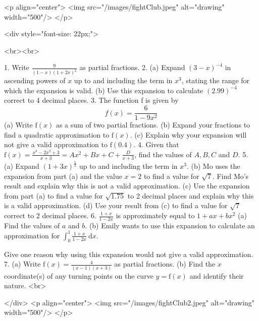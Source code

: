 <p align="center">
<img src="/images/fightClub.jpeg" alt="drawing" width="500"/>
</p>

<div style="font-size: 22px;">

<br><br>

1. Write $\frac{9}{(1-x)(1+2 x)^{2}}$ as partial fractions.
2. (a) Expand $(3-x)^{-4}$ in ascending powers of $x$ up to and including the term in $x^{3}$, stating the range for which the expansion is valid.
(b) Use this expansion to calculate $(2.99)^{-4}$ correct to 4 decimal places.
3. The function f is given by
$$
f(x)=\frac{6}{1-9 x^{2}}
$$
(a) Write $\mathrm{f}(x)$ as a sum of two partial fractions.
(b) Expand your fractions to find a quadratic approximation to $\mathrm{f}(x)$.
(c) Explain why your expansion will not give a valid approximation to $\mathrm{f}(0.4)$.
4. Given that $\mathrm{f}(x)=\frac{x^{3}-2 x^{2}+3}{x+3}=A x^{2}+B x+C+\frac{D}{x+3}$, find the values of $A, B, C$ and $D$.
5. (a) Expand $(1+3 x)^{\frac{1}{2}}$ up to and including the term in $x^{3}$.
(b) Mo uses the expansion from part (a) and the value $x=2$ to find a value for $\sqrt{7}$. Find Mo's result and explain why this is not a valid approximation.
(c) Use the expansion from part (a) to find a value for $\sqrt{1.75}$ to 2 decimal places and explain why this is a valid approximation.
(d) Use your result from (c) to find a value for $\sqrt{7}$ correct to 2 decimal places.
6. $\frac{1+x}{1-2 x}$ is approximately equal to $1+a x+b x^{2}$
(a) Find the values of $a$ and $b$.
(b) Emily wants to use this expansion to calculate an approximation for $\int_{0}^{1} \frac{1+x}{1-2 x} \mathrm{~d} x$.

Give one reason why using this expansion would not give a valid approximation.
7. (a) Write $\mathrm{f}(x)=\frac{4}{(x-1)(x+3)}$ as partial fractions.
(b) Find the $x$ coordinate(s) of any turning points on the curve $y=\mathrm{f}(x)$ and identify their nature.
<br>

</div>
<p align="center">
<img src="/images/fightClub2.jpeg" alt="drawing" width="500"/>
</p>
